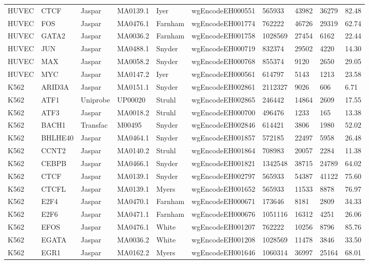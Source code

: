 {\begin{longtable}{p{1.1cm}p{1.0cm}p{1.0cm}p{1.0cm}p{1.0cm}p{2.3cm}p{1.0cm}p{0.8cm}p{0.8cm}p{0.8cm}}
HUVEC & CTCF & Jaspar & MA0139.1 & Iyer & wgEncodeEH000551 & 565933 & 43982 & 36279 & 82.48\\
HUVEC & FOS & Jaspar & MA0476.1 & Farnham & wgEncodeEH001774 & 762222 & 46726 & 29319 & 62.74\\
HUVEC & GATA2 & Jaspar & MA0036.2 & Farnham & wgEncodeEH001758 & 1028569 & 27454 & 6162 & 22.44\\
HUVEC & JUN & Jaspar & MA0488.1 & Snyder & wgEncodeEH000719 & 832374 & 29502 & 4220 & 14.30\\
HUVEC & MAX & Jaspar & MA0058.2 & Snyder & wgEncodeEH000768 & 855374 & 9120 & 2650 & 29.05\\
HUVEC & MYC & Jaspar & MA0147.2 & Iyer & wgEncodeEH000561 & 614797 & 5143 & 1213 & 23.58\\
K562 & ARID3A & Jaspar & MA0151.1 & Snyder & wgEncodeEH002861 & 2112327 & 9026 & 606 & 6.71\\
K562 & ATF1 & Uniprobe & UP00020 & Struhl & wgEncodeEH002865 & 246442 & 14864 & 2609 & 17.55\\
K562 & ATF3 & Jaspar & MA0018.2 & Struhl & wgEncodeEH000700 & 496476 & 1233 & 165 & 13.38\\
K562 & BACH1 & Transfac & M00495 & Snyder & wgEncodeEH002846 & 614421 & 3806 & 1980 & 52.02\\
K562 & BHLHE40 & Jaspar & MA0464.1 & Snyder & wgEncodeEH001857 & 572185 & 22497 & 5958 & 26.48\\
K562 & CCNT2 & Jaspar & MA0140.2 & Struhl & wgEncodeEH001864 & 708983 & 20057 & 2284 & 11.38\\
K562 & CEBPB & Jaspar & MA0466.1 & Snyder & wgEncodeEH001821 & 1342548 & 38715 & 24789 & 64.02\\
K562 & CTCF & Jaspar & MA0139.1 & Snyder & wgEncodeEH002797 & 565933 & 54387 & 41122 & 75.60\\
K562 & CTCFL & Jaspar & MA0139.1 & Myers & wgEncodeEH001652 & 565933 & 11533 & 8878 & 76.97\\
K562 & E2F4 & Jaspar & MA0470.1 & Farnham & wgEncodeEH000671 & 173646 & 8181 & 2809 & 34.33\\
K562 & E2F6 & Jaspar & MA0471.1 & Farnham & wgEncodeEH000676 & 1051116 & 16312 & 4251 & 26.06\\
K562 & EFOS & Jaspar & MA0476.1 & White & wgEncodeEH001207 & 762222 & 10256 & 8796 & 85.76\\
K562 & EGATA & Jaspar & MA0036.2 & White & wgEncodeEH001208 & 1028569 & 11478 & 3846 & 33.50\\
K562 & EGR1 & Jaspar & MA0162.2 & Myers & wgEncodeEH001646 & 1060314 & 36997 & 25164 & 68.01\\

\end{longtable}}
